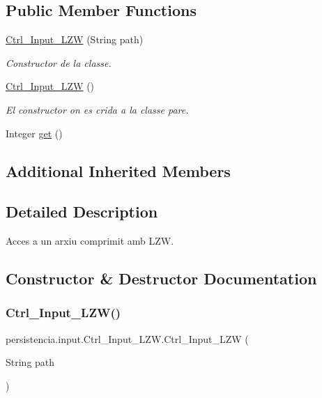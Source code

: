 \subsection*{Public Member Functions}
\begin{DoxyCompactItemize}
\item 
\hyperlink{classpersistencia_1_1input_1_1Ctrl__Input__LZW_a31503f303ac443e110379322e851791a}{Ctrl\+\_\+\+Input\+\_\+\+L\+ZW} (String path)
\begin{DoxyCompactList}\small\item\em Constructor de la classe. \end{DoxyCompactList}\item 
\hyperlink{classpersistencia_1_1input_1_1Ctrl__Input__LZW_a1b5319954e229993f11201438c72fe34}{Ctrl\+\_\+\+Input\+\_\+\+L\+ZW} ()
\begin{DoxyCompactList}\small\item\em El constructor on es crida a la classe pare. \end{DoxyCompactList}\item 
Integer \hyperlink{classpersistencia_1_1input_1_1Ctrl__Input__LZW_a821592197863ec1b1f052a794753ea40}{get} ()
\end{DoxyCompactItemize}
\subsection*{Additional Inherited Members}


\subsection{Detailed Description}
Acces a un arxiu comprimit amb L\+ZW. 

\subsection{Constructor \& Destructor Documentation}
\mbox{\label{classpersistencia_1_1input_1_1Ctrl__Input__LZW_a31503f303ac443e110379322e851791a}} 
\subsubsection{\texorpdfstring{Ctrl\+\_\+\+Input\+\_\+\+L\+Z\+W()}{Ctrl\_Input\_LZW()}\hspace{0.1cm}{\footnotesize\ttfamily [1/2]}}
{\footnotesize\ttfamily persistencia.\+input.\+Ctrl\+\_\+\+Input\+\_\+\+L\+Z\+W.\+Ctrl\+\_\+\+Input\+\_\+\+L\+ZW (\begin{DoxyParamCaption}\item[{String}]{path }\end{DoxyParamCaption})\hspace{0.3cm}{\ttfamily [inline]}}



